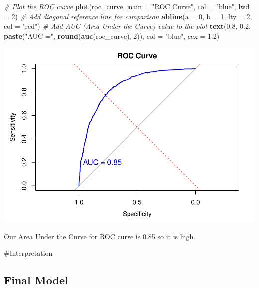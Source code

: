 \documentclass[
  twoside]{article}
\newenvironment{Shaded}{\begin{snugshade}}{\end{snugshade}}
\newcommand{\AttributeTok}[1]{\textcolor[rgb]{0.13,0.29,0.53}{#1}}
\newcommand{\CommentTok}[1]{\textcolor[rgb]{0.56,0.35,0.01}{\textit{#1}}}
\newcommand{\DecValTok}[1]{\textcolor[rgb]{0.00,0.00,0.81}{#1}}
\newcommand{\FloatTok}[1]{\textcolor[rgb]{0.00,0.00,0.81}{#1}}
\newcommand{\FunctionTok}[1]{\textcolor[rgb]{0.13,0.29,0.53}{\textbf{#1}}}
\newcommand{\NormalTok}[1]{#1}
\newcommand{\StringTok}[1]{\textcolor[rgb]{0.31,0.60,0.02}{#1}}
\begin{document}
\begin{Shaded}
\begin{Highlighting}[]
\CommentTok{\# Plot the ROC curve}
\FunctionTok{plot}\NormalTok{(roc\_curve, }\AttributeTok{main =} \StringTok{"ROC Curve"}\NormalTok{, }\AttributeTok{col =} \StringTok{"blue"}\NormalTok{, }\AttributeTok{lwd =} \DecValTok{2}\NormalTok{)}
\CommentTok{\# Add diagonal reference line for comparison}
\FunctionTok{abline}\NormalTok{(}\AttributeTok{a =} \DecValTok{0}\NormalTok{, }\AttributeTok{b =} \DecValTok{1}\NormalTok{, }\AttributeTok{lty =} \DecValTok{2}\NormalTok{, }\AttributeTok{col =} \StringTok{"red"}\NormalTok{)}
\CommentTok{\# Add AUC (Area Under the Curve) value to the plot}
\FunctionTok{text}\NormalTok{(}\FloatTok{0.8}\NormalTok{, }\FloatTok{0.2}\NormalTok{, }\FunctionTok{paste}\NormalTok{(}\StringTok{"AUC ="}\NormalTok{, }\FunctionTok{round}\NormalTok{(}\FunctionTok{auc}\NormalTok{(roc\_curve), }\DecValTok{2}\NormalTok{)), }\AttributeTok{col =} \StringTok{"blue"}\NormalTok{, }\AttributeTok{cex =} \FloatTok{1.2}\NormalTok{)}
\end{Highlighting}
\end{Shaded}

\includegraphics{Assigment2_files/figure-latex/unnamed-chunk-80-1.pdf}

Our Area Under the Curve for ROC curve is 0.85 so it is high.

\#Interpretation

\hypertarget{final-model}{%
\subsection{Final Model}\label{final-model}}
\end{document}
